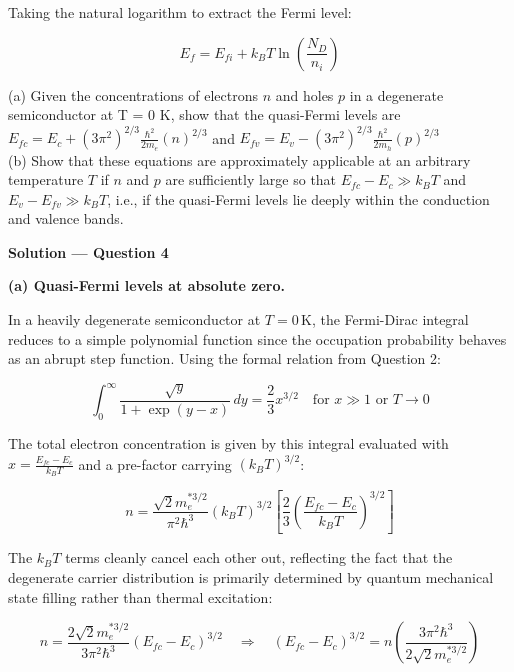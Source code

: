 Taking the natural logarithm to extract the Fermi level:

\begin{equation*}
  \boxed{E_f = E_{fi} + k_B T \ln\left(\frac{N_D}{n_i}\right)}
\end{equation*}

\begin{question}[Question 4]
(a) Given the concentrations of electrons $n$ and holes $p$ in a degenerate semiconductor at T = 0 K, show that the quasi-Fermi levels are $E_{fc} = E_c + (3\pi^2)^{2/3} \frac{\hbar^2}{2m_e} (n)^{2/3}$ and $E_{fv} = E_v - (3\pi^2)^{2/3} \frac{\hbar^2}{2m_h} (p)^{2/3}$\\
(b) Show that these equations are approximately applicable at an arbitrary temperature $T$ if $n$ and $p$ are sufficiently large so that $E_{fc} - E_c \gg k_B T$ and $E_v - E_{fv} \gg k_B T$, i.e., if the quasi-Fermi levels lie deeply within the conduction and valence bands.
\end{question}

\textbf{\large Solution --- Question 4}

\textbf{(a) Quasi-Fermi levels at absolute zero.}

In a heavily degenerate semiconductor at $T=0$\,K, the Fermi-Dirac integral reduces to a simple polynomial function since the occupation probability behaves as an abrupt step function. Using the formal relation from Question 2:

\begin{equation*}
  \int_{0}^{\infty} \frac{\sqrt{y}}{1 + \exp(y-x)}\,dy = \frac{2}{3} x^{3/2} \quad \text{for } x \gg 1 \text{ or } T \rightarrow 0
\end{equation*}

The total electron concentration is given by this integral evaluated with $x = \frac{E_{fc} - E_c}{k_B T}$ and a pre-factor carrying $(k_B T)^{3/2}$:

\begin{equation*}
  n = \frac{\sqrt{2} m_e^{* 3/2}}{\pi^2 \hbar^3} (k_B T)^{3/2} \left[ \frac{2}{3} \left( \frac{E_{fc} - E_c}{k_B T} \right)^{3/2} \right]
\end{equation*}

The $k_B T$ terms cleanly cancel each other out, reflecting the fact that the degenerate carrier distribution is primarily determined by quantum mechanical state filling rather than thermal excitation:

\begin{equation*}
  n = \frac{2\sqrt{2} m_e^{* 3/2}}{3 \pi^2 \hbar^3} (E_{fc} - E_c)^{3/2} \quad\Longrightarrow\quad (E_{fc} - E_c)^{3/2} = n \left( \frac{3 \pi^2 \hbar^3}{2\sqrt{2} m_e^{* 3/2}} \right)
\end{equation*}

